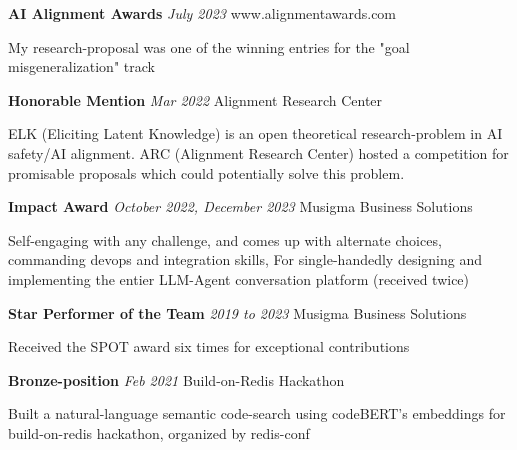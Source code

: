 \documentclass[fontsize=11pt]{article}
\newcommand{\sepspace}{\vspace*{1em}}   %
\newcommand{\EducationEntry}[4]{
    \noindent \textbf{#1} \hfill      %
    \colorbox{Black}{
      \parbox{8.5em}{
      \hfill\color{White}#2}} \par  %
    \noindent \textit{#3} \par        %
    \noindent\hangindent=2em\hangafter=0 \small #4 %
    \normalsize \par}
\newcommand{\AwardEntry}[4]{         %
    \noindent \textbf{#1} \noindent \textit{#3} \hfill {#2} \par
    \noindent \small #4 %
    \normalsize \par}
\begin{document}
\AwardEntry{AI Alignment Awards}{www.alignmentawards.com}
{July 2023}
{My research-proposal was one of the winning entries for the "goal misgeneralization" track}
\sepspace
\AwardEntry{Honorable Mention}{Alignment Research Center}
{Mar 2022}
{ELK (Eliciting Latent Knowledge) is an open theoretical research-problem in AI safety/AI alignment. ARC (Alignment Research Center) hosted a competition for promisable proposals which could potentially solve this problem.}
\sepspace
\AwardEntry{Impact Award}{Musigma Business Solutions}
{October 2022, December 2023}
{Self-engaging with any challenge, and comes up with alternate choices, commanding devops and integration skills, For single-handedly designing and implementing the entier LLM-Agent conversation platform (received twice)}
\sepspace
\AwardEntry{Star Performer of the Team}{Musigma Business Solutions}
{2019 to 2023}
{Received the SPOT award six times for exceptional contributions}
\sepspace
\AwardEntry{Bronze-position}{Build-on-Redis Hackathon}
{Feb 2021}
{Built a natural-language semantic code-search using codeBERT's embeddings for build-on-redis hackathon, organized by redis-conf}
\end{document}
